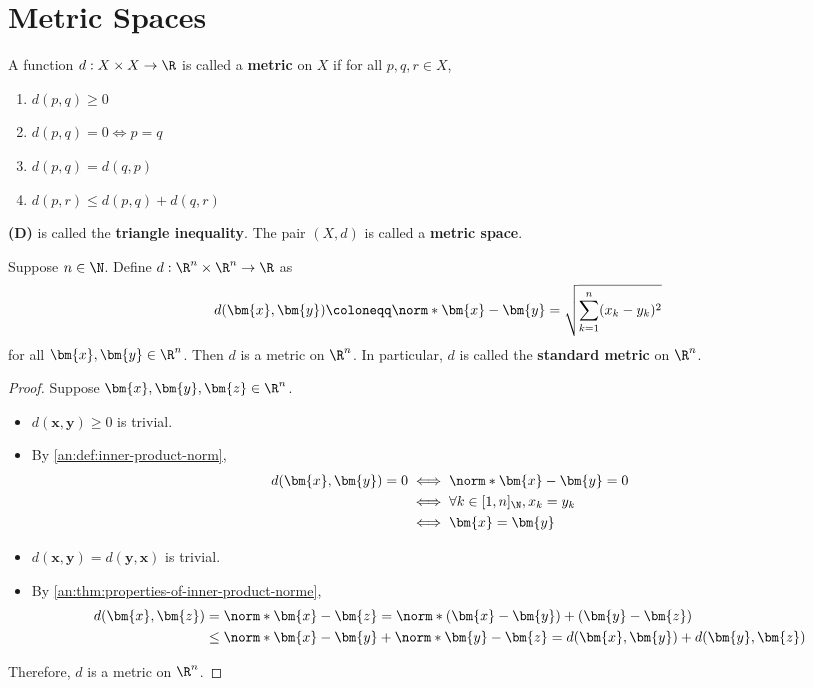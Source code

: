 \section{Metric Spaces} \label{an:sec:metric-spaces}

\begin{definition} \label{an:def:metric-space}
  A function $d: X \times X \to \R$ is called a \textbf{metric} on $X$ if for all $p, q, r \in X$,
  \begin{enumerate}[label=\textbf{(\Alph*)}]
    \item $d(p, q) \geq 0$
    \item $d(p, q) = 0 \iff p = q$
    \item $d(p, q) = d(q, p)$
    \item $d(p, r) \leq d(p, q) + d(q, r)$
  \end{enumerate}
  \textbf{(D)} is called the \textbf{triangle inequality}. The pair $(X, d)$ is called a \textbf{metric space}.

\end{definition}

\bigskip

\begin{theorem} \label{an:thm:standard-metric-on-rn}
  Suppose $n \in \N$. Define $d: \R^{n} \times \R^{n} \to \R$ as
  \[
    d(\bm{x}, \bm{y}) \coloneqq \norm*{\bm{x} - \bm{y}} = \sqrt{\sum_{k = 1}^{n} (x_{k} - y_{k})^{2}}
  \]
  for all $\bm{x}, \bm{y} \in \R^{n}$. Then $d$ is a metric on $\R^{n}$.
  In particular, $d$ is called the \textbf{standard metric} on $\R^{n}$.
\end{theorem}

\begin{proof}
  Suppose $\bm{x}, \bm{y}, \bm{z} \in \R^{n}$.
  \begin{itemize}
    \item $d(\bm{x}, \bm{y}) \geq 0$ is trivial.
    \item By \cref{an:def:inner-product-norm},
          \begin{align*}
            d(\bm{x}, \bm{y}) = 0 & \iff \norm*{\bm{x} - \bm{y}} = 0              \\
                                  & \iff \forall k \in [1, n]_{\N}, x_{k} = y_{k} \\
                                  & \iff \bm{x} = \bm{y}
          \end{align*}
    \item $d(\bm{x}, \bm{y}) = d(\bm{y}, \bm{x})$ is trivial.
    \item By \cref{an:thm:properties-of-inner-product-norme},
          \begin{align*}
            d(\bm{x}, \bm{z}) & = \norm*{\bm{x} - \bm{z}} =
            \norm*{(\bm{x} - \bm{y}) + (\bm{y} - \bm{z})}                              \\
                              & \leq \norm*{\bm{x} - \bm{y}} + \norm*{\bm{y} - \bm{z}}
            = d(\bm{x},\bm{y}) + d(\bm{y},\bm{z})
          \end{align*}
  \end{itemize}
  Therefore, $d$ is a metric on $\R^{n}$.
\end{proof}

